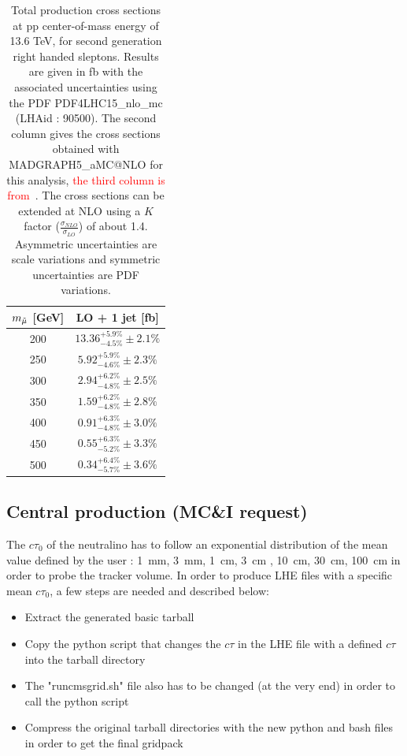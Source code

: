\documentclass{cernatlasnote}
\begin{document}
\begin{appendices}
\begin{table}
    \centering
    \caption{Total production cross sections at pp center-of-mass  energy of 13.6 TeV, for second generation right handed sleptons. Results are given in fb with the associated uncertainties using the PDF PDF4LHC15\_nlo\_mc (LHAid : 90500). The second column gives the cross sections obtained with MADGRAPH5\_aMC@NLO for this analysis, \textcolor{red}{the third column is from~\cite{Fuks_2014}}. The cross sections can be extended at NLO using a $K$ factor ($\frac{\sigma_{NLO}}{\sigma_{LO}}$) of about 1.4. Asymmetric uncertainties are scale variations and symmetric uncertainties are PDF variations.} 
    \label{tab:RIGHTXS13p6}
    \smallskip
    \begin{tabular}{ cc }
         $m_{\Tilde{\mu}}$ [GeV]  & LO + 1 jet [fb]  \\
         \hline
         200  & $13.36^{+5.9\%}_{-4.5\%} \pm 2.1\% $  \\
         250  & $5.92^{+5.9\%}_{-4.6\%} \pm 2.3\%$    \\
         300  & $2.94^{+6.2\%}_{-4.8\%} \pm 2.5\%$  \\
         350  & $1.59^{+6.2\%}_{-4.8\%} \pm 2.8\% $   \\
         400  & $0.91^{+6.3\%}_{-4.8\%} \pm 3.0\%$  \\
         450  & $0.55^{+6.3\%}_{-5.2\%} \pm 3.3\%$   \\
         500  & $0.34^{+6.4\%}_{-5.7\%} \pm 3.6\%$  \\
    \end{tabular}
\end{table}
\newpage

\subsection{Central production (MC\&I request)}
    The $c\tau_0$ of the neutralino has to follow an exponential distribution of the mean value defined by the user : 1~mm, 3~mm, 1~cm, 3~cm , 10~cm, 30~cm, 100~cm in order to probe the tracker volume. In order to produce LHE files with a specific mean $c\tau_0$, a few steps are needed and described below:
        \begin{itemize}
            \item Extract the generated basic tarball 
            \item Copy the python script that changes the $c\tau$ in the LHE file with a defined $c\tau$ into the tarball directory
            \item The "runcmsgrid.sh" file also has to be changed (at the very end) in order to call the python script
            \item Compress the original tarball directories with the new python and bash files in order to get the final gridpack
        \end{itemize}
\newpage


\end{appendices}
\end{document}
